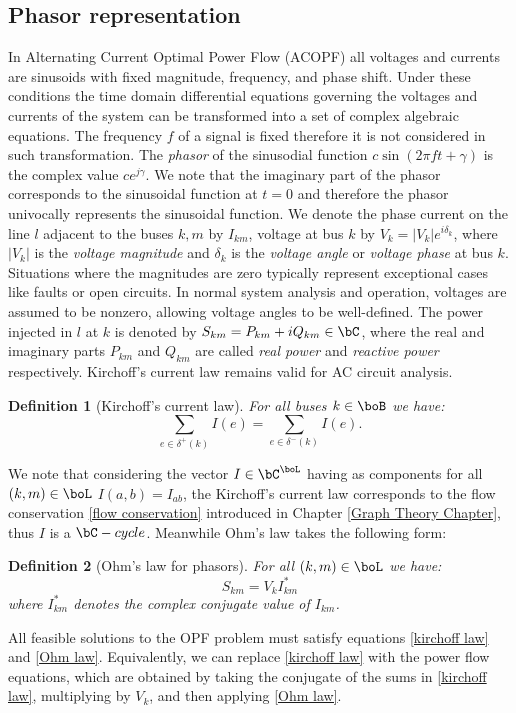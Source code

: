 \documentclass[11pt,a4paper,oneside,openany]{book}
\newtheorem{definition}{Definition}
\numberwithin{definition}{section}
\numberwithin{theorem}{section}
\numberwithin{problem}{section}
\begin{document}
\subsection*{Phasor representation}
In Alternating Current Optimal Power Flow (ACOPF) all voltages and currents are sinusoids with fixed magnitude, frequency, and phase shift. Under these conditions the time domain differential equations governing the voltages and currents of the system can be transformed into a set of complex algebraic equations. The frequency $f$ of a signal is fixed therefore it is not considered in such transformation. The \emph{phasor} of the sinusodial function $c\sin{(2\pi ft + \gamma)}$ is the complex value $ce^{j\gamma}$. We note that the imaginary part of the phasor corresponds to the sinusoidal function at $t=0$ and therefore the phasor univocally represents the sinusoidal function. We denote the phase current on the line $l$ adjacent to the buses $k,m$ by $I_{km}$, voltage at bus $k$ by $V_k= |V_k|e^{i \delta_k}$, where $|V_k|$ is the \emph{voltage magnitude} and $\delta_k$ is the \emph{voltage angle} or \emph{voltage phase} at bus $k$. Situations where the magnitudes are zero  typically represent exceptional cases like faults or open circuits. In normal system analysis and operation, voltages are assumed to be nonzero, allowing voltage angles to be well-defined. The power injected in $l$ at $k$ is denoted by $S_{km} = P_{km} + iQ_{km} \in \bC$, where the real and imaginary parts $P_{km}$ and $Q_{km}$ are called \emph{real power} and \emph{reactive power} respectively.
Kirchoff's current law remains valid for AC circuit analysis.
\begin{definition}[Kirchoff's current law]
For all buses $k \in \boB$ we have:
\begin{equation}\label{kirchoff law}
     \sum_{e \in \delta^+(k)}I(e) = \sum_{e \in \delta^-(k)}I(e).
\end{equation}
    
\end{definition}
 We note that considering the vector $I \in \bC^{\boL}$ having as components for all $(k,m) \in \boL$ $I(a,b) = I_{ab}$, the Kirchoff's current law corresponds to the flow conservation \eqref{flow conservation} introduced in Chapter \ref{Graph Theory Chapter}, thus $I$ is a $\bC-cycle$.
Meanwhile Ohm's law takes the following form:
\begin{definition}[Ohm's law for phasors]
For all $(k,m) \in \boL$ we have:
\begin{equation} \label{Ohm law}
    S_{km} = V_kI_{km}^*
\end{equation}
where $I_{km}^*$ denotes the complex conjugate value of $I_{km}$.
\end{definition}
All feasible solutions to the OPF problem must satisfy equations \eqref{kirchoff law} and \eqref{Ohm law}. Equivalently, we can replace \eqref{kirchoff law} with the power flow equations, which are obtained by taking the conjugate of the sums in \eqref{kirchoff law}, multiplying by \( V_k \), and then applying \eqref{Ohm law}.
 
\end{document}
